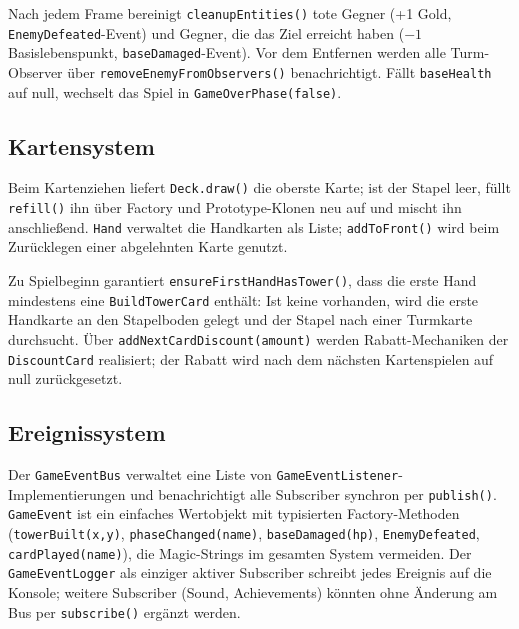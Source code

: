 Nach jedem Frame bereinigt \texttt{cleanupEntities()} tote Gegner (+1 Gold,
\texttt{EnemyDefeated}-Event) und Gegner, die das Ziel erreicht haben
($-1$ Basislebenspunkt, \texttt{baseDamaged}-Event). Vor dem Entfernen werden
alle Turm-Observer über \texttt{remove\-Enemy\-From\-Observers()} benachrichtigt. Fällt
\texttt{baseHealth} auf null, wechselt das Spiel in \texttt{GameOverPhase(false)}.

\subsection{Kartensystem}

Beim Kartenziehen liefert \texttt{Deck.draw()} die oberste Karte; ist der Stapel leer, füllt
\texttt{refill()} ihn über Factory und Prototype-Klonen neu auf und mischt ihn
anschließend. \texttt{Hand} verwaltet die Handkarten als Liste;
\texttt{addToFront()} wird beim Zurücklegen einer abgelehnten Karte genutzt.

Zu Spielbeginn garantiert \texttt{ensure\-First\-Hand\-Has\-Tower()}, dass die erste Hand
mindestens eine \texttt{BuildTowerCard} enthält: Ist keine vorhanden,
wird die erste Handkarte an den Stapelboden gelegt und der Stapel nach einer
Turmkarte durchsucht. Über \texttt{addNext\-Card\-Discount(amount)} werden
Rabatt-Mechaniken der \texttt{DiscountCard} realisiert; der Rabatt wird nach dem nächsten
Kartenspielen auf null zurückgesetzt.

\subsection{Ereignissystem}

Der \texttt{GameEventBus} verwaltet eine Liste von
\texttt{Game\-Event\-Listener}-Implementierungen und benachrichtigt alle Subscriber
synchron per \texttt{publish()}. \texttt{GameEvent} ist ein einfaches Wertobjekt
mit typisierten Factory-Methoden (\texttt{towerBuilt(x,y)},
\texttt{phaseChanged(name)}, \texttt{baseDamaged(hp)}, \texttt{EnemyDefeated},
\texttt{cardPlayed(name)}), die Magic-Strings im gesamten System vermeiden. Der
\texttt{GameEventLogger} als einziger aktiver Subscriber schreibt jedes Ereignis
auf die Konsole; weitere Subscriber (Sound, Achievements) könnten ohne Änderung
am Bus per \texttt{subscribe()} ergänzt werden.

